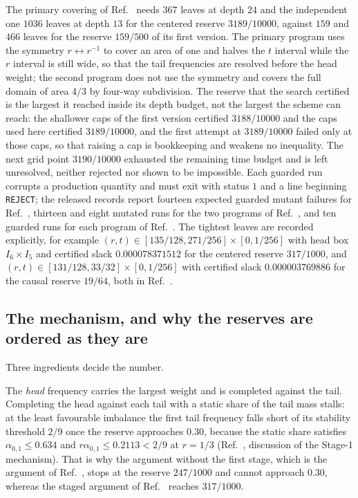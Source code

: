 \documentclass[aps,10pt,superscriptaddress,floatfix,amsmath,amssymb,nofootinbib]{revtex4-2}
\begin{document}
The primary covering of Ref.~\cite{anisosharp} needs $367$ leaves at depth $24$ and the
independent one $1036$ leaves at depth $13$ for the centered reserve $3189/10000$, against
$159$ and $466$ leaves for the reserve $159/500$ of its first version. The primary program
uses the symmetry $r\leftrightarrow r^{-1}$ to cover an area of one and halves the $t$
interval while the $r$ interval is still wide, so that the tail frequencies are resolved
before the head weight; the second program does not use the symmetry and covers the full
domain of area $4/3$ by four-way subdivision. The reserve that the search certified is the
largest it reached inside its depth budget, not the largest the scheme can reach: the
shallower caps of the first version certified $3188/10000$ and the caps used here certified
$3189/10000$, and the first attempt at $3189/10000$ failed only at those caps, so that
raising a cap is bookkeeping and weakens no inequality. The next grid point $3190/10000$
exhausted the remaining time budget and is left unresolved, neither rejected nor shown to be
impossible. Each guarded run corrupts a
production quantity and must exit with status $1$ and a line beginning \texttt{REJECT}; the
released records report fourteen expected guarded mutant failures for Ref.~\cite{optimum},
thirteen and eight mutated runs for the two programs of Ref.~\cite{finiteenergy}, and ten
guarded runs for each program of Ref.~\cite{anisosharp}. The tightest leaves are recorded
explicitly, for example
$(r,t)\in[135/128,271/256]\times[0,1/256]$ with head box $I_6\times I_5$ and certified slack
$0.000078371512$ for the centered reserve $317/1000$, and
$(r,t)\in[131/128,33/32]\times[0,1/256]$ with certified slack $0.000003769886$ for the
causal reserve $19/64$, both in Ref.~\cite{finiteenergy}.

\subsection{The mechanism, and why the reserves are ordered as they are}

Three ingredients decide the number.

The \emph{head} frequency carries the largest weight and is completed against the tail.
Completing the head against each tail with a static share of the tail mass stalls: at the
least favourable imbalance the first tail frequency falls short of its stability threshold
$2/9$ once the reserve approaches $0.30$, because the static share satisfies
$\alpha_{0,1}\le0.634$ and $r\alpha_{0,1}\le0.2113<2/9$ at $r=1/3$ (Ref.~\cite{finiteenergy},
discussion of the Stage-1 mechanism). That is why the argument without the first stage,
which is the argument of Ref.~\cite{optimum}, stops at the reserve $247/1000$ and cannot
approach $0.30$, whereas the staged argument of Ref.~\cite{finiteenergy} reaches $317/1000$.
\end{document}

